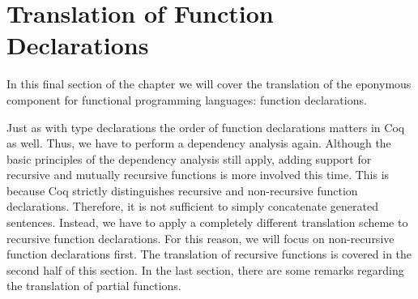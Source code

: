 \section{Translation of Function Declarations} \label{sec:translation:func-decl}
In this final section of the chapter we will cover the translation of the eponymous component for functional programming languages: function declarations.

Just as with type declarations the order of function declarations matters in Coq as well.
Thus, we have to perform a dependency analysis again.
Although the basic principles of the dependency analysis still apply, adding support for recursive and mutually recursive functions is more involved this time.
This is because Coq strictly distinguishes recursive and non-recursive function declarations.
Therefore, it is not sufficient to simply concatenate generated sentences.
Instead, we have to apply a completely different translation scheme to recursive function declarations.
For this reason, we will focus on non-recursive function declarations first.
The translation of recursive functions is covered in the second half of this section.
In the last section, there are some remarks regarding the translation of partial functions.


